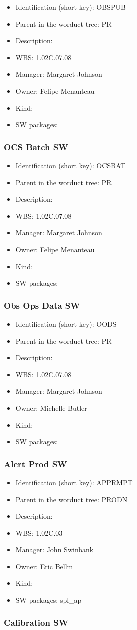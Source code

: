 \begin{itemize}\item Identification (short key): OBSPUB
\item Parent in the worduct tree: PR
\item Description: 
\item WBS: 1.02C.07.08
\item Manager: Margaret Johnson
\item Owner: Felipe Menanteau
\item Kind:
\item SW packages: 
\end{itemize}\subsubsection{OCS Batch SW}
\begin{itemize}\item Identification (short key): OCSBAT
\item Parent in the worduct tree: PR
\item Description: 
\item WBS: 1.02C.07.08
\item Manager: Margaret Johnson
\item Owner: Felipe Menanteau
\item Kind:
\item SW packages: 
\end{itemize}\subsubsection{Obs Ops Data SW}
\begin{itemize}\item Identification (short key): OODS
\item Parent in the worduct tree: PR
\item Description: 
\item WBS: 1.02C.07.08
\item Manager: Margaret Johnson
\item Owner: Michelle Butler
\item Kind:
\item SW packages: 
\end{itemize}\subsubsection{Alert Prod SW}
\begin{itemize}\item Identification (short key): APPRMPT
\item Parent in the worduct tree: PRODN
\item Description: 
\item WBS: 1.02C.03
\item Manager: John Swinbank
\item Owner: Eric Bellm
\item Kind:
\item SW packages: spl\_ap
\end{itemize}\subsubsection{Calibration SW}
